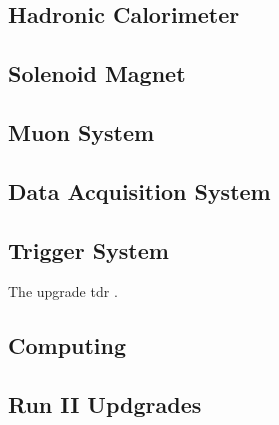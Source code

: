 \subsection{Hadronic Calorimeter}
\label{SUBSECTION:ExperimentalApparatus_CMS_HCAL}

\subsection{Solenoid Magnet}
\label{SUBSECTION:ExperimentalApparatus_CMS_Magnet}

\subsection{Muon System}
\label{SUBSECTION:ExperimentalApparatus_CMS_Mouns}

\subsection{Data Acquisition System}
\label{SUBSECTION:ExperimentalApparatus_CMS_DAQ}

\subsection{Trigger System}
\label{SUBSECTION:ExperimentalApparatus_CMS_Trigger}

The upgrade tdr \cite{CMSL1UpgradeTDR}.

\subsection{Computing}
\label{SUBSECTION:ExperimentalApparatus_CMS_Computing}


\subsection{Run II Updgrades}
\label{SUBSECTION:ExperimentalApparatus_CMS_RUNII}

